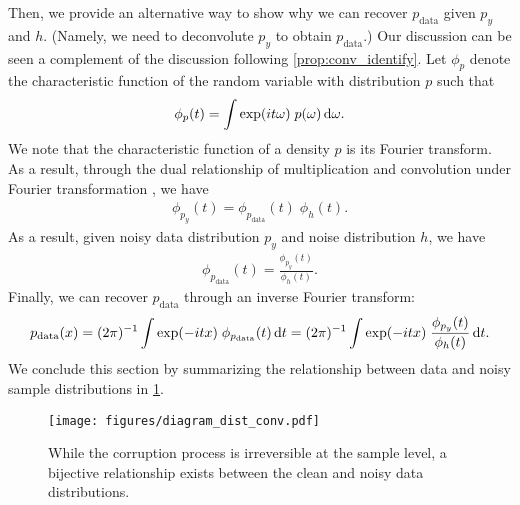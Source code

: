 Then, we provide an alternative way to show why we can recover $p_\text{data}$ given $p_y$ and $h$. (Namely, we need to deconvolute $p_y$ to obtain  $p_\text{data}$.) Our discussion can be seen a complement of the discussion following  \cref{prop:conv_identify}. Let $\phi_p$ denote the characteristic function of the random variable with distribution $p$ such that 
\begin{align}
    \phi_p(t) = \int \exp(i t \omega) \; p(\omega) \,\mathrm{d} \omega.
\end{align}
We note that the characteristic function of a density $p$ is its Fourier transform. As a result, through the dual relationship of multiplication and convolution under Fourier transformation \citep[Lemma A.5]{Meister2009}, we have 
\begin{align}
    \phi_{p_y}(t) = \phi_{p_\text{data}}(t) \; \phi_h (t).
\end{align}
As a result, given noisy data distribution $p_y$ and noise distribution $h$, we have
\begin{align}
    \phi_{p_\text{data}} (t) = \frac{\phi_{p_y}(t)}{\phi_h(t)}. 
\end{align}
Finally, we can recover $p_\text{data}$ through an inverse Fourier transform:
\begin{align}
    p_\text{data}(x) = (2\pi)^{-1} \int \exp(-itx) \; \phi_{p_\text{data}} (t) \,\mathrm{d} t = (2\pi)^{-1} \int \exp(-itx) \; \frac{\phi_{p_y}(t)}{\phi_h(t)} \,\mathrm{d} t.
\end{align}
We conclude this section by summarizing the relationship between data and noisy sample distributions in \cref{fig:diagram_dist_conv}.
\begin{figure}[h]
    \centering
    \texttt{[image: figures/diagram\_dist\_conv.pdf]}
    \caption{While the corruption process is irreversible at the sample level, a bijective relationship exists between the clean and noisy data distributions.}
    \label{fig:diagram_dist_conv}
\end{figure}